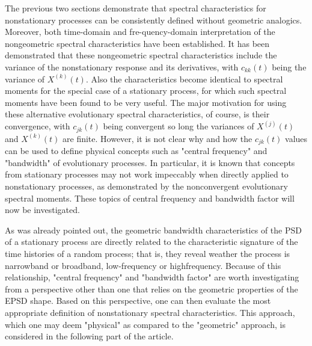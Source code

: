 \documentclass{article}
\begin{document}
The previous two sections demonstrate that spectral characteristics for
nonstationary processes can be consistently defined without geometric
analogics. Moreover, both time-domain and fre-quency-domain interpretation of
the nongeometric spectral characteristics have been established. It has been
demonstrated that these nongeometric spectral characteristics include the
variance of the nonstationary response and its derivatives, with $c_{kk} (t)$
being the variance of $X^{(k)} (t)$. Also the characteristics become identical
to spectral moments for the special case of a stationary process, for which
such spectral moments have been found to be very useful. The major motivation
for using these alternative evolutionary spectral characteristics, of course,
is their convergence, with $c_{jk} (t)$ being convergent so long the variances
of $X^{(j)} (t)$ and $X^{(k)} (t)$ are finite. However, it is not clear why
and how the $c_{jk} (t)$ values can be used to define physical concepts such
as "central frequency" and "bandwidth" of evolutionary processes. In
particular, it is known that concepts from stationary processes may not work
impeccably when directly applied to nonstationary processes, as demonstrated
by the nonconvergent evolutionary spectral moments. These topics of central
frequency and bandwidth factor will now be investigated.

As was already pointed out, the geometric bandwidth characteristics of the PSD
of a stationary process are directly related to the characteristic signature
of the time histories of a random process; that is, they reveal weather the
process is narrowband or broadband, low-frequency or highfrequency. Because of
this relationship, "central frequency" and "bandwidth factor" are worth
investigating from a perspective other than one that relies on the geometric
properties of the EPSD shape. Based on this perspective, one can then evaluate
the most appropriate definition of nonstationary spectral characteristics.
This approach, which one may deem "physical" as compared to the "geometric"
approach, is considered in the following part of the article.
\end{document}
